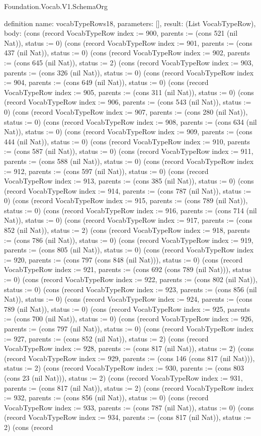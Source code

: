 \begin{lexlean}{Foundation.Vocab.V1.SchemaOrg}
\begin{semanticmodule}
definition{
  name: vocabTypeRows18,
  parameters: [],
  result: (List VocabTypeRow),
  body: (cons (record VocabTypeRow {index := 900, parents := (cons 521 (nil Nat)), status := 0}) (cons (record VocabTypeRow {index := 901, parents := (cons 437 (nil Nat)), status := 0}) (cons (record VocabTypeRow {index := 902, parents := (cons 645 (nil Nat)), status := 2}) (cons (record VocabTypeRow {index := 903, parents := (cons 326 (nil Nat)), status := 0}) (cons (record VocabTypeRow {index := 904, parents := (cons 649 (nil Nat)), status := 0}) (cons (record VocabTypeRow {index := 905, parents := (cons 311 (nil Nat)), status := 0}) (cons (record VocabTypeRow {index := 906, parents := (cons 543 (nil Nat)), status := 0}) (cons (record VocabTypeRow {index := 907, parents := (cons 280 (nil Nat)), status := 0}) (cons (record VocabTypeRow {index := 908, parents := (cons 634 (nil Nat)), status := 0}) (cons (record VocabTypeRow {index := 909, parents := (cons 444 (nil Nat)), status := 0}) (cons (record VocabTypeRow {index := 910, parents := (cons 587 (nil Nat)), status := 0}) (cons (record VocabTypeRow {index := 911, parents := (cons 588 (nil Nat)), status := 0}) (cons (record VocabTypeRow {index := 912, parents := (cons 597 (nil Nat)), status := 0}) (cons (record VocabTypeRow {index := 913, parents := (cons 385 (nil Nat)), status := 0}) (cons (record VocabTypeRow {index := 914, parents := (cons 787 (nil Nat)), status := 0}) (cons (record VocabTypeRow {index := 915, parents := (cons 789 (nil Nat)), status := 0}) (cons (record VocabTypeRow {index := 916, parents := (cons 714 (nil Nat)), status := 0}) (cons (record VocabTypeRow {index := 917, parents := (cons 852 (nil Nat)), status := 2}) (cons (record VocabTypeRow {index := 918, parents := (cons 786 (nil Nat)), status := 0}) (cons (record VocabTypeRow {index := 919, parents := (cons 805 (nil Nat)), status := 0}) (cons (record VocabTypeRow {index := 920, parents := (cons 797 (cons 848 (nil Nat))), status := 0}) (cons (record VocabTypeRow {index := 921, parents := (cons 692 (cons 789 (nil Nat))), status := 0}) (cons (record VocabTypeRow {index := 922, parents := (cons 802 (nil Nat)), status := 0}) (cons (record VocabTypeRow {index := 923, parents := (cons 856 (nil Nat)), status := 0}) (cons (record VocabTypeRow {index := 924, parents := (cons 789 (nil Nat)), status := 0}) (cons (record VocabTypeRow {index := 925, parents := (cons 700 (nil Nat)), status := 0}) (cons (record VocabTypeRow {index := 926, parents := (cons 797 (nil Nat)), status := 0}) (cons (record VocabTypeRow {index := 927, parents := (cons 852 (nil Nat)), status := 2}) (cons (record VocabTypeRow {index := 928, parents := (cons 817 (nil Nat)), status := 2}) (cons (record VocabTypeRow {index := 929, parents := (cons 146 (cons 817 (nil Nat))), status := 2}) (cons (record VocabTypeRow {index := 930, parents := (cons 803 (cons 23 (nil Nat))), status := 2}) (cons (record VocabTypeRow {index := 931, parents := (cons 817 (nil Nat)), status := 2}) (cons (record VocabTypeRow {index := 932, parents := (cons 856 (nil Nat)), status := 0}) (cons (record VocabTypeRow {index := 933, parents := (cons 787 (nil Nat)), status := 0}) (cons (record VocabTypeRow {index := 934, parents := (cons 817 (nil Nat)), status := 2}) (cons (record }
\end{semanticmodule}
\end{lexlean}
